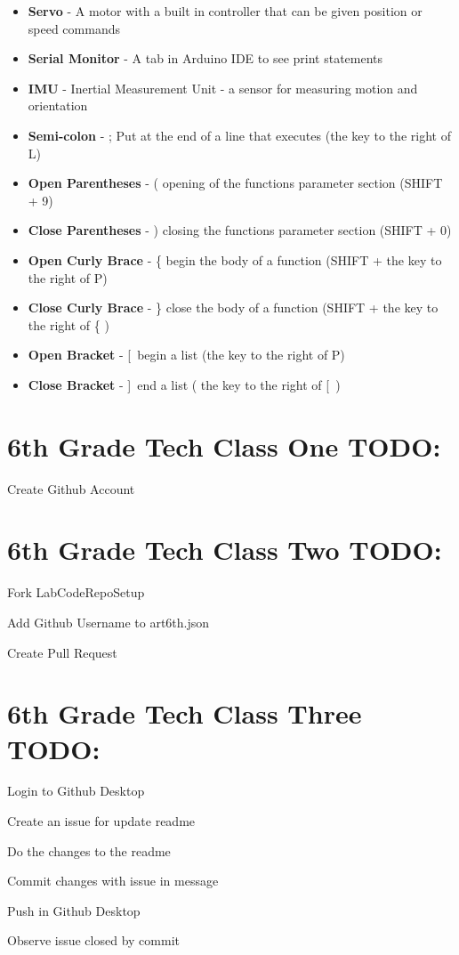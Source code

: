 \documentclass{article}
\begin{document}
\begin{itemize}
  \item \textbf{Servo} - A motor with a built in controller that can be given position or speed commands
  \item \textbf{Serial Monitor} - A tab in Arduino IDE to see print statements
  \item \textbf{IMU} - Inertial Measurement Unit - a sensor for measuring motion and orientation
  \item \textbf{Semi-colon} - ; Put at the end of a line that executes (the key to the right of L)
  \item \textbf{Open Parentheses} - ( opening of the functions parameter section (SHIFT + 9)
  \item \textbf{Close Parentheses} - ) closing the functions parameter section (SHIFT + 0)
  \item \textbf{Open Curly Brace} - \{ begin the body of a function (SHIFT + the key to the right of P)
  \item \textbf{Close Curly Brace} - \} close the body of a function (SHIFT + the key to the right of \{ )
  \item \textbf{Open Bracket} - [\ begin a list (the key to the right of P)
  \item \textbf{Close Bracket} - ]\ end a list ( the key to the right of [\ )
  
\end{itemize}

\newpage
\section{6th Grade Tech Class One TODO:}
\begin{todolist}
	\item Create Github Account
\end{todolist}


\section{6th Grade Tech Class Two TODO:}
\begin{todolist}
	\item Fork LabCodeRepoSetup
	\item Add Github Username to art6th.json
	\item Create Pull Request
\end{todolist}


\section{6th Grade Tech Class Three TODO:}
\begin{todolist}
	\item Login to Github Desktop
	\item Create an issue for update readme
	\item Do the changes to the readme
	\item Commit changes with issue in message
	\item Push in Github Desktop
	\item Observe issue closed by commit 
\end{todolist}
\end{document}
